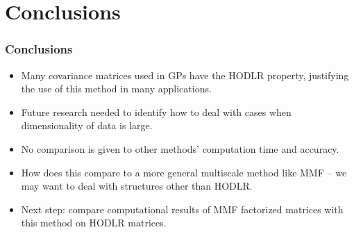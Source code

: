 \documentclass{beamer}
\begin{document}
\section{Conclusions}

\begin{frame}
\frametitle{Conclusions}
\begin{itemize}
\item Many covariance matrices used in GPs have the HODLR property, justifying the use of this method in many applications.
\item Future research needed to identify how to deal with cases when dimensionality of data is large.
\item No comparison is given to other methods' computation time and accuracy.
\item How does this compare to a more general multiscale method like MMF -- we may want to deal with structures other than HODLR.
\item Next step: compare computational results of MMF factorized matrices with this method on HODLR matrices.

\end{itemize}
\end{frame}
\end{document}
